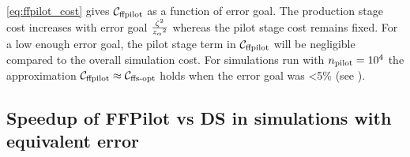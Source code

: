 \eqref{eq:ffpilot_cost} gives ${\mathcal{C}}_{\textrm{ffpilot}}$ as a function of error goal. The production stage cost increases with error goal  $\frac{\zeta {}^2}{z_{\alpha} {}^2}$ whereas the pilot stage cost remains fixed. For a low enough error goal, the pilot stage term in ${\mathcal{C}}_{\textrm{ffpilot}}$ will be negligible compared to the overall simulation cost. For simulations run with $n_{\textrm{pilot}} = 10^4$ the approximation ${\mathcal{C}}_{\textrm{ffpilot}} \approx {\mathcal{C}}_{\textrm{ffs-opt}}$ holds when the error goal was \textless 5\% (see ).

\subsection{Speedup of FFPilot vs DS in simulations with equivalent error}
\label{sec:speedup}


